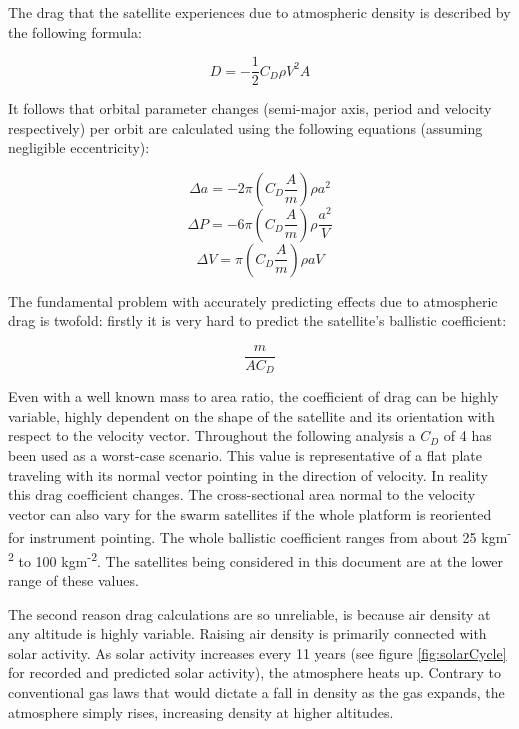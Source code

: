 The drag that the satellite experiences due to atmospheric density is described by the following formula:

\begin{equation}
D = -\frac{1}{2} C_D \rho V^2A
\label{drag}
\end{equation}

It follows that orbital parameter changes (semi-major axis, period and velocity respectively) per orbit are calculated using the following equations (assuming negligible eccentricity):

\begin{equation}
\Delta a = -2 \pi \left( C_D \frac{A}{m} \right) \rho a^2
\label{deltaSMA}
\end{equation}
\begin{equation}
\Delta P = -6 \pi \left( C_D \frac{A}{m} \right) \rho \frac{a^2}{V}
\label{deltaP}
\end{equation}
\begin{equation}
\Delta V = \pi \left( C_D \frac{A}{m} \right) \rho aV
\label{deltaV}
\end{equation}

The fundamental problem with accurately predicting effects due to atmospheric drag is twofold: firstly it is very hard to predict the satellite's ballistic coefficient:

\begin{equation}
\frac{m}{AC_D}
\label{ball}
\end{equation}

Even with a well known mass to area ratio, the coefficient of drag can be highly variable, highly dependent on the shape of the satellite and its orientation with respect to the velocity vector. Throughout the following analysis a $C_D$ of 4 has been used as a worst-case scenario. This value is representative of a flat plate traveling with its normal vector pointing in the direction of velocity. In reality this drag coefficient changes. The cross-sectional area normal to the velocity vector can also vary for the swarm satellites if the whole platform is reoriented for instrument pointing. The whole ballistic coefficient ranges from about 25 kgm\textsuperscript{-2} to 100 kgm\textsuperscript{-2}. The satellites being considered in this document are at the lower range of these values.

The second reason drag calculations are so unreliable, is because air density at any altitude is highly variable. Raising air density is primarily connected with solar activity. As solar activity increases every 11 years (see figure \ref{fig:solarCycle} for recorded and predicted solar activity), the atmosphere heats up. Contrary to conventional gas laws that would dictate a fall in density as the gas expands, the atmosphere simply rises, increasing density at higher altitudes.

